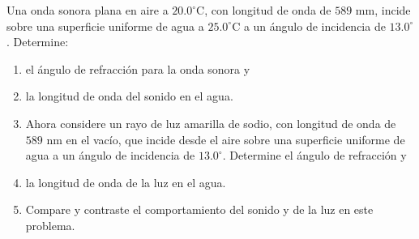 \item Una onda sonora plana en aire a $20.0^\circ\text{C}$, con longitud de onda de $589\text{ mm}$, incide sobre una superficie uniforme de agua a $25.0^\circ\text{C}$ a un ángulo de incidencia de $13.0^\circ$. Determine:
\begin{enumerate}
    \item el ángulo de refracción para la onda sonora y
    \item la longitud de onda del sonido en el agua.
    \item Ahora considere un rayo de luz amarilla de sodio, con longitud de onda de $589\text{ nm}$ en el vacío, que incide desde el aire sobre una superficie uniforme de agua a un ángulo de incidencia de $13.0^\circ$. Determine el ángulo de refracción y
    \item la longitud de onda de la luz en el agua.
    \item Compare y contraste el comportamiento del sonido y de la luz en este problema.
\end{enumerate}